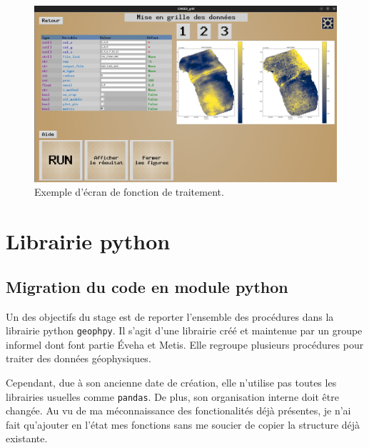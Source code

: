 \documentclass[12pt]{article}
\begin{document}
    \begin{figure}[ht!]
        \centering
        \includegraphics[width=\textwidth]{Images/IntGraph_CMDEX_k.png}
        \caption{Exemple d'écran de fonction de traitement.}
        \label{fig:4_k}
    \end{figure}

\newpage
\section{Librairie python}
\subsection{Migration du code en module python}

    Un des objectifs du stage est de reporter l'ensemble des procédures dans la librairie python \texttt{geophpy}. Il s'agit d'une librairie créé et maintenue par un groupe informel dont font partie Éveha et Metis. Elle regroupe plusieurs procédures pour traiter des données géophysiques.

    Cependant, due à son ancienne date de création, elle n'utilise pas toutes les librairies usuelles comme \texttt{pandas}. De plus, son organisation interne doit être changée. Au vu de ma méconnaissance des fonctionalités déjà présentes, je n'ai fait qu'ajouter en l'état mes fonctions sans me soucier de copier la structure déjà existante.
\end{document}
